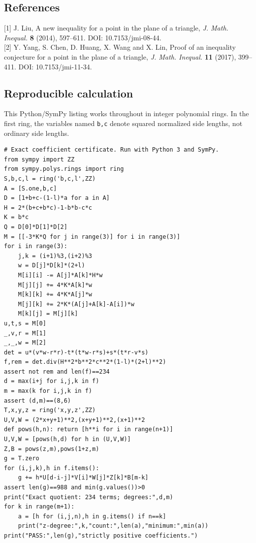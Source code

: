 \documentclass[11pt,a4paper]{article}
\numberwithin{equation}{section}
\theoremstyle{definition}
\theoremstyle{remark}
\begin{document}
\subsection*{References}
[1] J. Liu, A new inequality for a point in the plane of a triangle,
\emph{J. Math. Inequal.} \textbf{8} (2014), 597--611.
DOI: 10.7153/jmi-08-44.\\[3pt]
[2] Y. Yang, S. Chen, D. Huang, X. Wang and X. Lin,
Proof of an inequality conjecture for a point in the plane of a
triangle, \emph{J. Math. Inequal.} \textbf{11} (2017), 399--411.
DOI: 10.7153/jmi-11-34.


\subsection*{Reproducible calculation}
This Python/SymPy listing works throughout in integer polynomial
rings. In the first ring, the variables named \texttt{b,c} denote
squared normalized side lengths, not ordinary side lengths.
\begingroup\scriptsize
\begin{Verbatim}
# Exact coefficient certificate. Run with Python 3 and SymPy.
from sympy import ZZ
from sympy.polys.rings import ring
S,b,c,l = ring('b,c,l',ZZ)
A = [S.one,b,c]
D = [1+b+c-(1-l)*a for a in A]
H = 2*(b+c+b*c)-1-b*b-c*c
K = b*c
Q = D[0]*D[1]*D[2]
M = [[-3*K*Q for j in range(3)] for i in range(3)]
for i in range(3):
    j,k = (i+1)%3,(i+2)%3
    w = D[j]*D[k]*(2+l)
    M[i][i] -= A[j]*A[k]*H*w
    M[j][j] += 4*K*A[k]*w
    M[k][k] += 4*K*A[j]*w
    M[j][k] += 2*K*(A[j]+A[k]-A[i])*w
    M[k][j] = M[j][k]
u,t,s = M[0]
_,v,r = M[1]
_,_,w = M[2]
det = u*(v*w-r*r)-t*(t*w-r*s)+s*(t*r-v*s)
f,rem = det.div(H**2*b**2*c**2*(1-l)*(2+l)**2)
assert not rem and len(f)==234
d = max(i+j for i,j,k in f)
m = max(k for i,j,k in f)
assert (d,m)==(8,6)
T,x,y,z = ring('x,y,z',ZZ)
U,V,W = (2*x+y+1)**2,(x+y+1)**2,(x+1)**2
def pows(h,n): return [h**i for i in range(n+1)]
U,V,W = [pows(h,d) for h in (U,V,W)]
Z,B = pows(z,m),pows(1+z,m)
g = T.zero
for (i,j,k),h in f.items():
    g += h*U[d-i-j]*V[i]*W[j]*Z[k]*B[m-k]
assert len(g)==988 and min(g.values())>0
print("Exact quotient: 234 terms; degrees:",d,m)
for k in range(m+1):
    a = [h for (i,j,n),h in g.items() if n==k]
    print("z-degree:",k,"count:",len(a),"minimum:",min(a))
print("PASS:",len(g),"strictly positive coefficients.")
\end{Verbatim}

\endgroup

\par\endgroup
\end{document}
